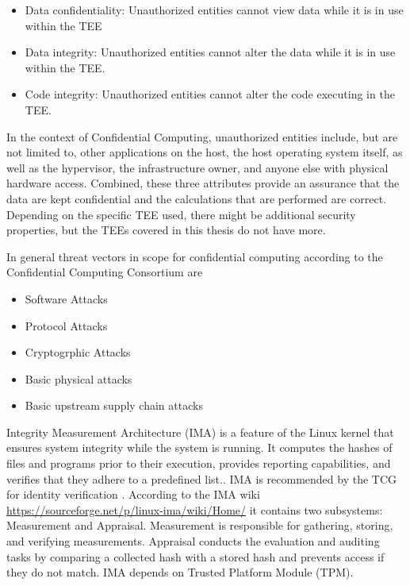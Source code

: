 \begin{itemize} 
    \item \guillemotright Data confidentiality: Unauthorized entities cannot view data while it is in use within the TEE
    \item Data integrity: Unauthorized entities cannot alter the data while it is in use within the TEE.
    \item Code integrity: Unauthorized entities cannot alter the code executing in the TEE.\guillemotleft \cite{noauthor_ccc_outreach_whitepaper_updated_november_2022pdf_2023}
\end{itemize} 
In the context of Confidential Computing, unauthorized entities include, but are not limited to, other applications on the host, the host operating system itself, as well as the hypervisor, the infrastructure owner, and anyone else with physical hardware access. 
Combined, these three attributes provide an assurance that the data are kept confidential and the calculations that are performed are correct.
Depending on the specific TEE used, there might be additional security properties, but the TEEs covered in this thesis do not have more\cite{noauthor_ccc_outreach_whitepaper_updated_november_2022pdf_2023}.


In general threat vectors in scope for confidential computing according to the Confidential Computing Consortium are

\begin{itemize}
    \item Software Attacks
    \item Protocol Attacks
    \item Cryptogrphic Attacks
    \item Basic physical attacks
    \item Basic upstream supply chain attacks
\end{itemize}


Integrity Measurement Architecture (IMA) is a feature of the Linux kernel that ensures system integrity while the system is running. It computes the hashes of files and programs prior to their execution, provides reporting capabilities, and verifies that they adhere to a predefined list.\cite{Luo_container_ima}. IMA is recommended by the TCG for identity verification \cite{TCG Guidance on Integrity Measurements and Event Log Processing}. According to the IMA wiki \url{https://sourceforge.net/p/linux-ima/wiki/Home/} it contains two subsystems: Measurement and Appraisal. Measurement is responsible for gathering, storing, and verifying measurements. Appraisal conducts the evaluation and auditing tasks by comparing a collected hash with a stored hash and prevents access if they do not match. IMA depends on Trusted Platform Module (TPM)\cite{Luo_container_ima}. 

